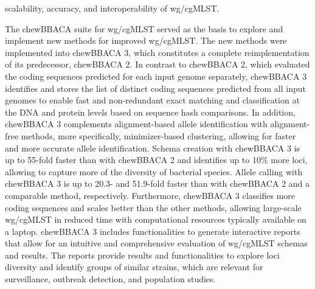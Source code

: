 scalability, accuracy, and interoperability of wg/cgMLST.

The chewBBACA suite for wg/cgMLST served as the basis to explore and implement new methods for improved wg/cgMLST. The new methods were implemented into chewBBACA 3, which constitutes a complete reimplementation of its predecessor, chewBBACA 2. In contrast to chewBBACA 2, which evaluated the coding sequences predicted for each input genome separately, chewBBACA 3 identifies and stores the list of distinct coding sequences predicted from all input genomes to enable fast and non-redundant exact matching and classification at the DNA and protein levels based on sequence hash comparisons. In addition, chewBBACA 3 complements alignment-based allele identification with alignment-free methods, more specifically, minimizer-based clustering, allowing for faster and more accurate allele identification. Schema creation with chewBBACA 3 is up to 55-fold faster than with chewBBACA 2 and identifies up to 10\% more loci, allowing to capture more of the diversity of bacterial species. Allele calling with chewBBACA 3 is up to 20.3- and 51.9-fold faster than with chewBBACA 2 and a comparable method, respectively. Furthermore, chewBBACA 3 classifies more coding sequences and scales better than the other methods, allowing large-scale wg/cgMLST in reduced time with computational resources typically available on a laptop. chewBBACA 3 includes functionalities to generate interactive reports that allow for an intuitive and comprehensive evaluation of wg/cgMLST schemas and results. The reports provide results and functionalities to explore loci diversity and identify groups of similar strains, which are relevant for surveillance, outbreak detection, and population studies.

